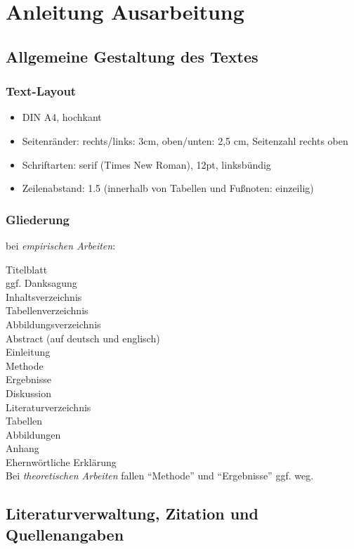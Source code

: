 \chapter[]{Anleitung Ausarbeitung}
\label{app:anleitung}
\section{Allgemeine Gestaltung des Textes}

\subsection{Text-Layout}
\begin{itemize}
\item DIN A4, hochkant
\item Seitenränder: rechts/links: 3cm, oben/unten: 2,5 cm, Seitenzahl rechts oben
\item Schriftarten: serif (Times New Roman), 12pt, linksbündig
\item Zeilenabstand: 1.5 (innerhalb von Tabellen und Fußnoten: einzeilig)
\end{itemize}

\subsection{Gliederung}
bei \emph{empirischen Arbeiten}:

Titelblatt\\
ggf. Danksagung\\
Inhaltsverzeichnis\\
Tabellenverzeichnis\\
Abbildungsverzeichnis\\
Abstract (auf deutsch und englisch)\\
Einleitung\\
Methode\\
Ergebnisse\\
Diskussion\\
Literaturverzeichnis\\
Tabellen\\
Abbildungen\\
Anhang\\
Ehernwörtliche Erklärung\\

Bei \emph{theoretischen Arbeiten} fallen \enquote{Methode} und \enquote{Ergebnisse} ggf. weg.

\section{Literaturverwaltung, Zitation und Quellenangaben}

